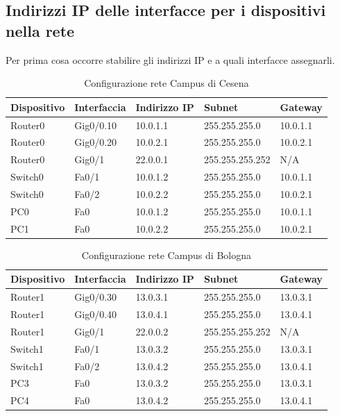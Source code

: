 \documentclass[a4paper,12pt]{report}
\begin{document}
\subsection{Indirizzi IP delle interfacce per i dispositivi nella rete}
Per prima cosa occorre stabilire gli indirizzi IP e a quali interfacce assegnarli.
\begin{table}[H]
\begin{tabular}{@{}lllll@{}}
\toprule
Dispositivo & Interfaccia & Indirizzo IP & Subnet & Gateway \\ \midrule
Router0 & Gig0/0.10 & 10.0.1.1 & 255.255.255.0 & 10.0.1.1 \\
Router0 & Gig0/0.20 & 10.0.2.1 & 255.255.255.0 & 10.0.2.1 \\
Router0 & Gig0/1 & 22.0.0.1 & 255.255.255.252 & N/A \\
Switch0 & Fa0/1 & 10.0.1.2 & 255.255.255.0 & 10.0.1.1 \\
Switch0 & Fa0/2 & 10.0.2.2 & 255.255.255.0 & 10.0.2.1 \\
PC0 & Fa0 & 10.0.1.2 & 255.255.255.0 & 10.0.1.1 \\
PC1 & Fa0 & 10.0.2.2 & 255.255.255.0 & 10.0.2.1 \\ \bottomrule
\end{tabular}
\caption{Configurazione rete Campus di Cesena}
\label{table:config_cesena}
\end{table}
\begin{table}[H]
\begin{tabular}{lllll}
\hline
Dispositivo & Interfaccia & Indirizzo IP & Subnet & Gateway \\ \hline
Router1 & Gig0/0.30 & 13.0.3.1 & 255.255.255.0 & 13.0.3.1 \\
Router1 & Gig0/0.40 & 13.0.4.1 & 255.255.255.0 & 13.0.4.1 \\
Router1 & Gig0/1 & 22.0.0.2 & 255.255.255.252 & N/A \\
Switch1 & Fa0/1 & 13.0.3.2 & 255.255.255.0 & 13.0.3.1 \\
Switch1 & Fa0/2 & 13.0.4.2 & 255.255.255.0 & 13.0.4.1 \\
PC3 & Fa0 & 13.0.3.2 & 255.255.255.0 & 13.0.3.1 \\
PC4 & Fa0 & 13.0.4.2 & 255.255.255.0 & 13.0.4.1 \\ \hline
\end{tabular}
\caption{Configurazione rete Campus di Bologna}
\label{table:config_bologna}
\end{table}
\end{document}
